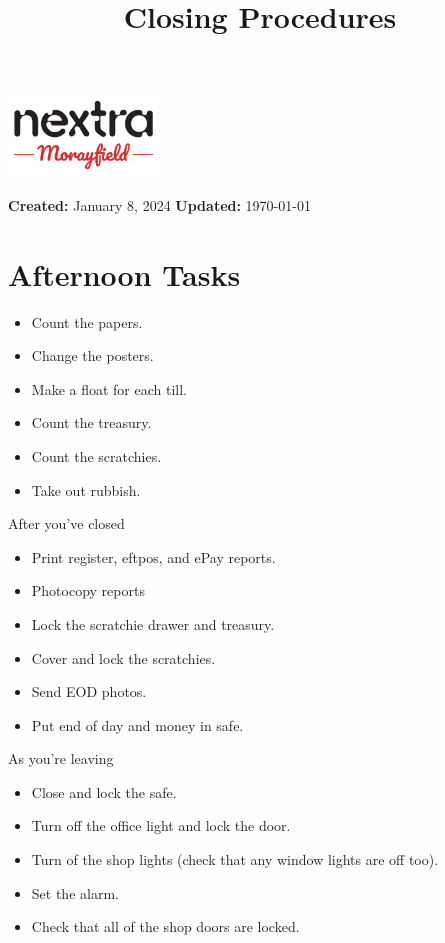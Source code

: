\documentclass[a4paper, 12pt]{article}
\title{Closing Procedures}
\author{}
\date{}
\begin{document}
\begin{minipage}[t]{1\columnwidth}%
    \begin{flushright}
        \vspace{-0.6in}
        \includegraphics[width=0.3\textwidth]{MonextraNewCropped.png}
        \vspace{0.5in}
    \par\end{flushright}%
\end{minipage}
{\let\newpage\relax\maketitle}

\noindent
\textbf{Created:} January 8, 2024
\hfill
\textbf{Updated:} \today


\tableofcontents

\newpage
\section{Afternoon Tasks}
\begin{itemize}
    \item Count the papers.
    \item Change the posters.
    \item Make a float for each till.
    \item Count the treasury.
    \item Count the scratchies.
    \item Take out rubbish.
\end{itemize}
\newline
After you've closed
\begin{itemize}
    \item Print register, eftpos, and ePay reports.
    \item Photocopy reports
    \item Lock the scratchie drawer and treasury.
    \item Cover and lock the scratchies.
    \item Send EOD photos.
    \item Put end of day and money in safe.
\end{itemize}
\newline
As you're leaving
\begin{itemize}
    \item Close and lock the safe.
    \item Turn off the office light and lock the door.
    \item Turn of the shop lights (check that any window lights are off too).
    \item Set the alarm.
    \item Check that all of the shop doors are locked.
\end{itemize}
\end{document}
